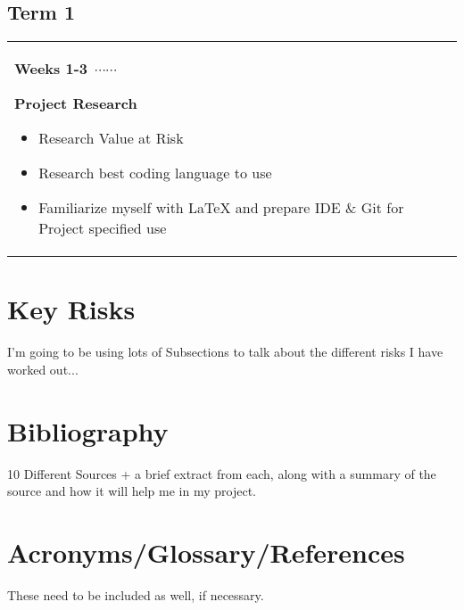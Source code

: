 \documentclass{article}
\newcommand\ytl[2]{
    \parbox[b]{12em}{\hfill{\color{cyan}\bfseries\sffamily #1}~$\cdots\cdots$~}\makebox[0pt][c]{$\bullet$}\vrule\quad \parbox[c]{10cm}{\vspace{6pt}\color[RGB]{20, 20, 90}\raggedright\sffamily #2\par}\\[-2pt]
}
\begin{document}
\subsection{Term 1}
\vspace{-2\baselineskip}
\begin{table}[H]
  \centering
  \color{black}
  \begin{longtable}{p{1\linewidth}}
      \endfirsthead
      \endhead
      \ytl{Weeks 1-3}{
        \textbf{Project Research}
          \vspace{8pt}
          \begin{itemize}
              \item Research Value at Risk
              \item Research best coding language to use
              \item Familiarize myself with LaTeX and prepare IDE \& Git for Project specified use
          \end{itemize}
      } 
  \end{longtable}
  \end{table}

\section{Key Risks}
I'm going to be using lots of Subsections to talk about the different risks I have worked out...

\section{Bibliography}
10 Different Sources + a brief extract from each, along with a summary of the source and how it will help me in my project.

\section{Acronyms/Glossary/References}
These need to be included as well, if necessary.
\end{document}
